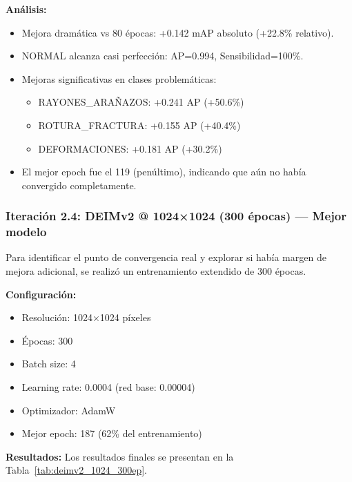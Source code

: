 \textbf{Análisis:}
\begin{itemize}
    \item Mejora dramática vs 80 épocas: +0.142 mAP absoluto (+22.8\% relativo).
    \item NORMAL alcanza casi perfección: AP=0.994, Sensibilidad=100\%.
    \item Mejoras significativas en clases problemáticas:
    \begin{itemize}
        \item \mbox{RAYONES\_ARAÑAZOS}: +0.241 AP (+50.6\%)
        \item \mbox{ROTURA\_FRACTURA}: +0.155 AP (+40.4\%)
        \item DEFORMACIONES: +0.181 AP (+30.2\%)
    \end{itemize}
    \item El mejor epoch fue el 119 (penúltimo), indicando que aún no había convergido completamente.
\end{itemize}

\subsubsection{Iteración 2.4: DEIMv2 @ 1024×1024 (300 épocas) --- Mejor modelo}

Para identificar el punto de convergencia real y explorar si había margen de mejora adicional, se realizó un entrenamiento extendido de 300 épocas.

\textbf{Configuración:}
\begin{itemize}
    \item Resolución: 1024×1024 píxeles
    \item Épocas: 300
    \item Batch size: 4
    \item Learning rate: 0.0004 (red base: 0.00004)
    \item Optimizador: AdamW
    \item Mejor epoch: 187 (62\% del entrenamiento)
\end{itemize}

\textbf{Resultados:} Los resultados finales se presentan en la Tabla~\ref{tab:deimv2_1024_300ep}.

